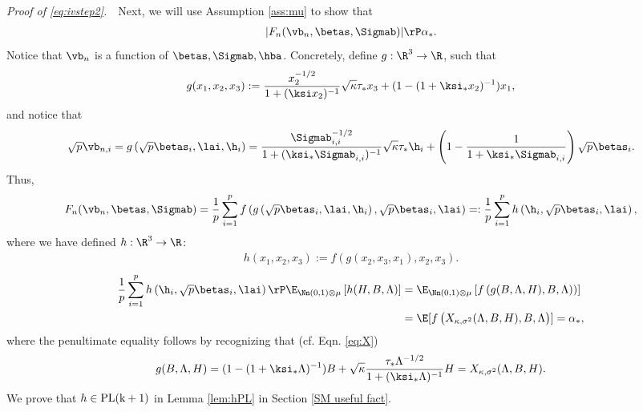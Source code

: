 \vspace{2pt}
\noindent\emph{Proof of \eqref{eq:ivstep2}.}~~Next, we will use Assumption \ref{ass:mu} to show that 
\begin{align}
|F_n(\vb_n,\betas,\Sigmab)| \rP \alpha_*.\label{eq:AO_conv}
\end{align}
Notice that $\vb_n$ is a function of $\betas,\Sigmab,\hba$. Concretely, define $g:\R^3\rightarrow\R$, such that
$$
g(x_1,x_2,x_3) := \frac{x_2^{-1/2}}{1+(\ksi x_2)^{-1}}\sqrt{\kappa}\tau_* x_3 + (1-(1+\ksi_*x_2)^{-1})x_1,
$$
and notice that
$$
\sqrt{p}\vb_{n,i} = g\left(\sqrt{p}\betas_i,\lai,\h_i\right) = \frac{{\Sigmab_{i,i}^{-1/2}}}{1+(\ksi_*\Sigmab_{i,i})^{-1}}\sqrt{\kappa}\tau_*\h_i +\left(1-\frac{1}{1+\ksi_*\Sigmab_{i,i}}\right)\sqrt{p}\betas_i.
$$
Thus,
$$
F_n(\vb_n,\betas,\Sigmab) = \frac{1}{p}\sum_{i=1}^p f\left(g\left(\sqrt{p}\betas_i,\lai,\h_i\right),\sqrt{p}\betas_i,\lai\right) =: \frac{1}{p}\sum_{i=1}^p h\left(\h_i,\sqrt{p}\betas_i,\lai\right),
$$
where we have defined $h:\R^3\rightarrow\R$:
\begin{align}
h(x_1,x_2,x_3) := f\left(g(x_2,x_3,x_1),x_2,x_3\right).\label{h func}
\end{align}
\begin{align}
\frac{1}{p}\sum_{i=1}^p h\left(\h_i,\sqrt{p}\betas_i,\lai\right) \rP \E_{\Nn(0,1)\otimes \mu}\left[h(H,B,\Lambda)\right] &=  \E_{\Nn(0,1)\otimes \mu}\left[f\left(g(B,\Lambda,H),B,\Lambda\right))\right]\\
& = \E[f\left(X_{\kappa,\sigma^2}(\Lambda,B,H),B,\Lambda\right)] = \alpha_*,
\end{align}
where the penultimate equality follows by recognizing that (cf. Eqn. \eqref{eq:X})
$$
g(B,\Lambda,H) = (1-(1+\ksi_*\Lambda)^{-1})B + \sqrt{\kappa}\frac{\tau_*\Lambda^{-1/2}}{1+(\ksi_*\Lambda)^{-1}}H =  X_{\kappa,\sigma^2}(\Lambda,B,H).
$$
We prove that $h\in\rm{PL}(k+1)$ in Lemma \ref{lem:hPL} in Section \ref{SM useful fact}.

